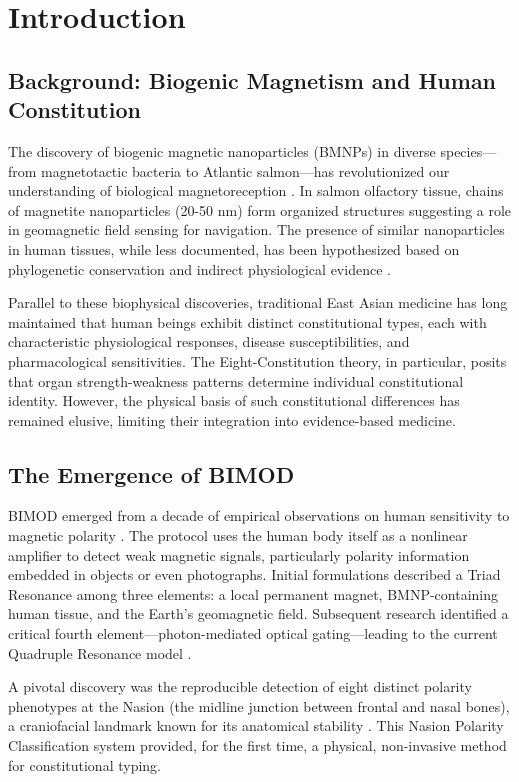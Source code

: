 \documentclass[12pt,a4paper]{article}
\begin{document}
\section{Introduction}

\subsection{Background: Biogenic Magnetism and Human Constitution}

The discovery of biogenic magnetic nanoparticles (BMNPs) in diverse species—from magnetotactic bacteria to Atlantic salmon—has revolutionized our understanding of biological magnetoreception \cite{gorobets2019}. In salmon olfactory tissue, chains of magnetite nanoparticles (20-50 nm) form organized structures suggesting a role in geomagnetic field sensing for navigation. The presence of similar nanoparticles in human tissues, while less documented, has been hypothesized based on phylogenetic conservation and indirect physiological evidence \cite{xu2024}.

Parallel to these biophysical discoveries, traditional East Asian medicine has long maintained that human beings exhibit distinct constitutional types, each with characteristic physiological responses, disease susceptibilities, and pharmacological sensitivities. The Eight-Constitution theory, in particular, posits that organ strength-weakness patterns determine individual constitutional identity. However, the physical basis of such constitutional differences has remained elusive, limiting their integration into evidence-based medicine.

\subsection{The Emergence of BIMOD}

BIMOD emerged from a decade of empirical observations on human sensitivity to magnetic polarity \cite{yoon2026_001}. The protocol uses the human body itself as a nonlinear amplifier to detect weak magnetic signals, particularly polarity information embedded in objects or even photographs. Initial formulations described a Triad Resonance among three elements: a local permanent magnet, BMNP-containing human tissue, and the Earth's geomagnetic field. Subsequent research identified a critical fourth element—photon-mediated optical gating—leading to the current Quadruple Resonance model \cite{yoon2026_001v3}.

A pivotal discovery was the reproducible detection of eight distinct polarity phenotypes at the Nasion (the midline junction between frontal and nasal bones), a craniofacial landmark known for its anatomical stability \cite{yoon2026_003}. This Nasion Polarity Classification system provided, for the first time, a physical, non-invasive method for constitutional typing.
\end{document}
